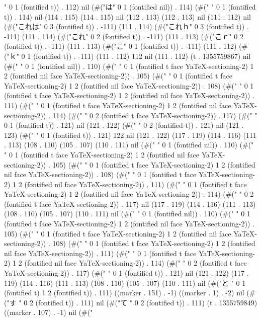 " 0 1 (fontified t)) . 112) nil (#("は" 0 1 (fontified nil)) . 114) (#("
" 0 1 (fontified t)) . 114) nil (114 . 115) (114 . 115) nil (112 . 113) (112 . 113) nil (111 . 112) nil (#("これは" 0 3 (fontified t)) . -111) (111 . 114) (#("これｈ" 0 3 (fontified t)) . -111) (111 . 114) (#("これ" 0 2 (fontified t)) . -111) (111 . 113) (#("こｒ" 0 2 (fontified t)) . -111) (111 . 113) (#("こ" 0 1 (fontified t)) . -111) (111 . 112) (#("ｋ" 0 1 (fontified t)) . -111) (111 . 112) 112 nil (111 . 112) (t . 1355759867) nil (#("
" 0 1 (fontified nil)) . 110) (#("
 " 0 1 (fontified t face YaTeX-sectioning-2) 1 2 (fontified nil face YaTeX-sectioning-2)) . 105) (#("
 " 0 1 (fontified t face YaTeX-sectioning-2) 1 2 (fontified nil face YaTeX-sectioning-2)) . 108) (#("
 " 0 1 (fontified t face YaTeX-sectioning-2) 1 2 (fontified nil face YaTeX-sectioning-2)) . 111) (#("
 " 0 1 (fontified t face YaTeX-sectioning-2) 1 2 (fontified nil face YaTeX-sectioning-2)) . 114) (#("
 " 0 2 (fontified t face YaTeX-sectioning-2)) . 117) (#(" " 0 1 (fontified t)) . 121) nil (121 . 122) (#("
 " 0 2 (fontified t)) . 121) nil (121 . 123) (#(" " 0 1 (fontified t)) . 121) 122 nil (121 . 122) (117 . 119) (114 . 116) (111 . 113) (108 . 110) (105 . 107) (110 . 111) nil (#(" " 0 1 (fontified nil)) . 110) (#("
 " 0 1 (fontified t face YaTeX-sectioning-2) 1 2 (fontified nil face YaTeX-sectioning-2)) . 105) (#("
 " 0 1 (fontified t face YaTeX-sectioning-2) 1 2 (fontified nil face YaTeX-sectioning-2)) . 108) (#("
 " 0 1 (fontified t face YaTeX-sectioning-2) 1 2 (fontified nil face YaTeX-sectioning-2)) . 111) (#("
 " 0 1 (fontified t face YaTeX-sectioning-2) 1 2 (fontified nil face YaTeX-sectioning-2)) . 114) (#("
 " 0 2 (fontified t face YaTeX-sectioning-2)) . 117) nil (117 . 119) (114 . 116) (111 . 113) (108 . 110) (105 . 107) (110 . 111) nil (#("
" 0 1 (fontified nil)) . 110) (#("
 " 0 1 (fontified t face YaTeX-sectioning-2) 1 2 (fontified nil face YaTeX-sectioning-2)) . 105) (#("
 " 0 1 (fontified t face YaTeX-sectioning-2) 1 2 (fontified nil face YaTeX-sectioning-2)) . 108) (#("
 " 0 1 (fontified t face YaTeX-sectioning-2) 1 2 (fontified nil face YaTeX-sectioning-2)) . 111) (#("
 " 0 1 (fontified t face YaTeX-sectioning-2) 1 2 (fontified nil face YaTeX-sectioning-2)) . 114) (#("
 " 0 2 (fontified t face YaTeX-sectioning-2)) . 117) (#(" " 0 1 (fontified t)) . 121) nil (121 . 122) (117 . 119) (114 . 116) (111 . 113) (108 . 110) (105 . 107) (110 . 111) nil (#("と
" 0 1 (fontified t) 1 2 (fontified t)) . 111) ((marker . 151) . -1) ((marker . 1) . -2) nil (#("す
" 0 2 (fontified t)) . 111) nil (#("て
" 0 2 (fontified t)) . 111) (t . 1355759849) ((marker . 107) . -1) nil (#("
